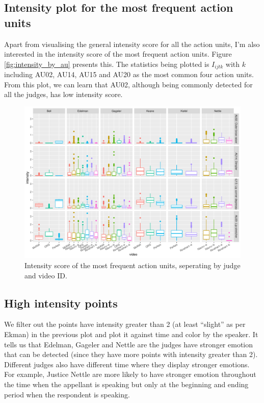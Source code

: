 \documentclass{monashthesis}
\begin{document}
\hypertarget{intensity-plot-for-the-most-frequent-action-units}{%
\subsection{Intensity plot for the most frequent action units}\label{intensity-plot-for-the-most-frequent-action-units}}

Apart from visualising the general intensity score for all the action units, I'm also interested in the intensity score of the most frequent action units. Figure \ref{fig:intensity_by_au} presents this. The statistics being plotted is \(I_{ijtk}\) with \(k\) including AU02, AU14, AU15 and AU20 as the most common four action units. From this plot, we can learn that AU02, although being commonly detected for all the judges, has low intensity score.

\begin{figure}

{\centering \includegraphics[width=1\linewidth]{figures/unnamed-chunk-19-1} 

}

\caption{Intensity score of the most frequent action units, seperating by judge and video ID.\label{fig:intensity_by_au}}\label{fig:unnamed-chunk-19}
\end{figure}

\hypertarget{high-intensity-points}{%
\subsection{High intensity points}\label{high-intensity-points}}

We filter out the points have intensity greater than 2 (at least ``slight'' as per Ekman) in the previous plot and plot it against time and color by the speaker. It tells us that Edelman, Gageler and Nettle are the judges have stronger emotion that can be detected (since they have more points with intensity greater than 2). Different judges also have different time where they display stronger emotions. For example, Justice Nettle are more likely to have stronger emotion throughout the time when the appellant is speaking but only at the beginning and ending period when the respondent is speaking.
\end{document}
